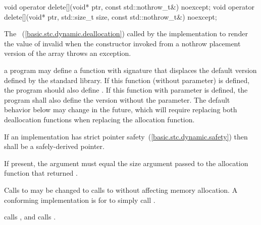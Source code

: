 %
\begin{itemdecl}
void operator delete[](void* ptr, const std::nothrow_t&) noexcept;
void operator delete[](void* ptr, std::size_t size, const std::nothrow_t&) noexcept;
\end{itemdecl}

\begin{itemdescr}
\pnum
\effects
The
~(\ref{basic.stc.dynamic.deallocation})
called by the implementation
to render the value of  invalid
when the constructor invoked from a nothrow
placement version of the array  throws an exception.

\pnum
\replaceable
a \Cpp program may define a function with signature
that displaces the default version defined by the
\Cpp standard library. If this function (without  parameter) is defined,
the program should also define
.
If this function with  parameter is defined, the program shall also define the
version without the  parameter.
\enternote The default behavior below may change in the future, which will require
replacing both deallocation functions when replacing the allocation function. \exitnote

\pnum
\requires
If an implementation has strict pointer safety~(\ref{basic.stc.dynamic.safety})
then  shall be a safely-derived pointer.

\pnum
\requires
If present, the  argument must equal the size argument
passed to the allocation function that returned .

\pnum
\required
Calls to 
may be changed to calls to 
without affecting memory allocation.
\enternote A conforming implementation is for
to simply call . \exitnote

\pnum
{}
{} calls
, and
 calls
.
\end{itemdescr}

